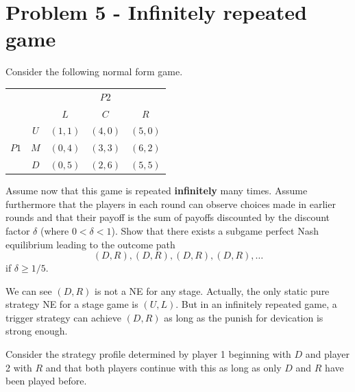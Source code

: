 \documentclass{article}
\begin{document}

\section{Problem 5 - Infinitely repeated game}

Consider the following normal form game.

\begin{center}
\label{tab:infi}
\begin{tabular}{cc|c|c|c|}
  & \multicolumn{1}{c}{} & \multicolumn{3}{c}{$P2$}  \\
  & \multicolumn{1}{c}{} & \multicolumn{1}{c}{$L$} & \multicolumn{1}{c}{$C$} & \multicolumn{1}{c}{$R$} \\\cline{3-5}
            & $U$ & $(1,1)$ & $(4,0)$  & $(5,0)$ \\   \cline{3-5}  
      $P1$  & $M$ & $(0,4)$ & $(3,3)$  & $(6,2)$ \\   \cline{3-5}
            & $D$ & $(0,5)$ & $(2,6)$  & $(5,5)$ \\   \cline{3-5}

\end{tabular}
\end{center}

Assume now that this game is repeated \textbf{infinitely} many times. Assume furthermore that the players in each round can observe choices made in earlier rounds and that their payoff is the sum of payoffs discounted by the discount factor   $\delta$ (where $0 < \delta < 1$). Show that there exists a subgame perfect Nash equilibrium leading to the outcome path
$$(D, R), (D, R), (D, R), (D, R), \dots $$
if $\delta \geq 1/5$. 

\bigskip

\begin{mdframed}[backgroundcolor=blue!20,linecolor=white]
We can see $(D,R)$ is not a NE for any stage. Actually, the only static pure strategy NE for a stage game is $(U,L)$. But in an infinitely repeated game, a trigger strategy can achieve $(D,R)$ as long as the punish for devication is strong enough.
\end{mdframed}

Consider the strategy profile determined by player 1 beginning with $D$ and player 2 with $R$ and that both players continue with this as long as only $D$ and $R$ have been played before. 
\end{document}

